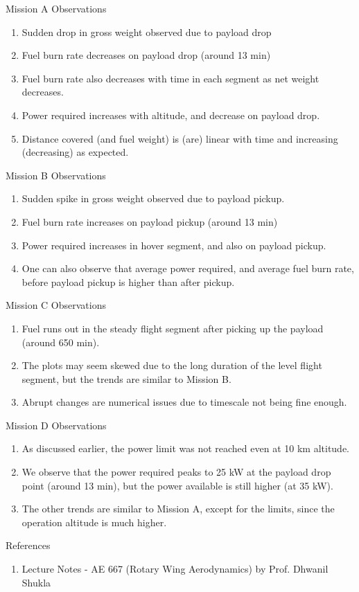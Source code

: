 \documentclass{beamer}
\begin{document}
\begin{frame}{Mission A Observations}
  \begin{enumerate}
    \item Sudden drop in gross weight observed due to payload drop
    \item Fuel burn rate decreases on payload drop (around 13 min)
    \item Fuel burn rate also decreases with time in each segment as net weight decreases.
    \item Power required increases with altitude, and decrease on payload drop.
    \item Distance covered (and fuel weight) is (are) linear with time and increasing (decreasing) as expected.
  \end{enumerate} 
\end{frame}

\begin{frame}{Mission B Observations}
  \begin{enumerate}
    \item Sudden spike in gross weight observed due to payload pickup.
    \item Fuel burn rate increases on payload pickup (around 13 min)
    \item Power required increases in hover segment, and also on payload pickup.
    \item One can also observe that average power required, and average fuel burn rate, before payload pickup is higher than after pickup.
  \end{enumerate}
\end{frame}

\begin{frame}{Mission C Observations}
  \begin{enumerate}
    \item Fuel runs out in the steady flight segment after picking up the payload (around 650 min).
    \item The plots may seem skewed due to the long duration of the level flight segment, but the trends are similar to Mission B.
    \item Abrupt changes are numerical issues due to timescale not being fine enough.
  \end{enumerate}
  
\end{frame}

\begin{frame}{Mission D Observations}
  \begin{enumerate}
    \item As discussed earlier, the power limit was not reached even at 10 km altitude.
    \item We observe that the power required peaks to 25 kW at the payload drop point (around 13 min), but the power available is still higher (at 35 kW). 
    \item The other trends are similar to Mission A, except for the limits, since the operation altitude is much higher.
  \end{enumerate}
  
\end{frame}

\begin{frame}{References}
 \begin{enumerate}
     \item Lecture Notes - AE 667 (Rotary Wing Aerodynamics) by Prof. Dhwanil Shukla
 \end{enumerate}
\end{frame}
\end{document}
